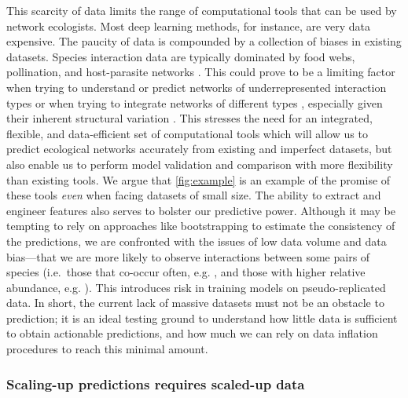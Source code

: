 This scarcity of data limits the range of computational tools that can
be used by network ecologists. Most deep learning methods, for instance,
are very data expensive. The paucity of data is compounded by a
collection of biases in existing datasets. Species interaction data are
typically dominated by food webs, pollination, and host-parasite
networks \cite{Ings2009EcoNet, Poisot2020EnvBia}. This could prove to
be a limiting factor when trying to understand or predict networks of
underrepresented interaction types or when trying to integrate networks
of different types \cite{Fontaine2011EcoEvo}, especially given their
inherent structural variation \cite{Michalska-Smith2019TelEco}. This
stresses the need for an integrated, flexible, and data-efficient set of
computational tools which will allow us to predict ecological networks
accurately from existing and imperfect datasets, but also enable us to
perform model validation and comparison with more flexibility than
existing tools. We argue that \autoref{fig:example} is an example of the promise
of these tools \emph{even} when facing datasets of small size. The
ability to extract and engineer features also serves to bolster our
predictive power. Although it may be tempting to rely on approaches like
bootstrapping to estimate the consistency of the predictions, we are
confronted with the issues of low data volume and data bias---that we
are more likely to observe interactions between some pairs of species
(i.e.~those that co-occur often, e.g. \cite{Cazelles2015TheSpe}, and those
with higher relative abundance, e.g. \cite{Vazquez2009UniPat}). This
introduces risk in training models on pseudo-replicated data. In short,
the current lack of massive datasets must not be an obstacle to
prediction; it is an ideal testing ground to understand how little data
is sufficient to obtain actionable predictions, and how much we can rely
on data inflation procedures to reach this minimal amount.

\subsubsection{Scaling-up predictions requires scaled-up
data}\label{scaling-up-predictions-requires-scaled-up-data}

